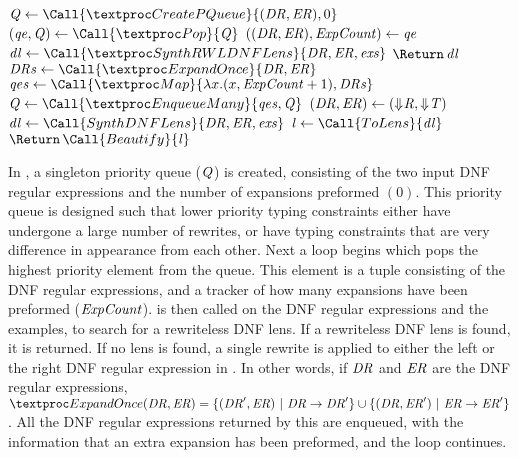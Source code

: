 \documentclass[numbers,10pt,preprint\ifanon ,nocopyrightspace\fi]{sigplanconf}
\begin{document}
\begin{algorithm}
  \caption{\SynthLens}
  \label{alg:synthlens}
  \begin{algorithmic}[1]
    \State $\Queue \gets \Call{\CreatePQueue}{(\DNFRegex,\DNFRegexAlt),0}$
    \While{$\True$}
    \State $(\QueueElement,\Queue) \gets \Call{\Pop}{\Queue}$
    \State $((\mathit{DR},\mathit{ER}),\mathit{ExpCount}) \gets \mathit{qe}$
    \State $\DNFLens \gets
    \Call{\SynthRWLDNFLens}{\DNFRegex,\DNFRegexAlt,\Examples}$
    \If{$\DNFLens \neq \Null$}
    \State $\ReturnVal{\DNFLens}$
    \Else
    \State $\DNFRegexs \gets \Call{\ExpandOnce}{\DNFRegex,\DNFRegexAlt}$
    \State $\QueueElements \gets \Call{\Map}{\lambda x.(x,\ExpCount+1),\DNFRegexs}$
    \State $\Queue \gets \Call{\EnqueueMany}{\QueueElements,\Queue}$
    \EndIf
    \EndWhile
    \EndFunction
    \Statex
    \State $(\mathit{DR},\mathit{ER}) \gets
    (\Downarrow\mkern-4mu \mathit{R},\Downarrow\mkern-4mu \mathit{T})$
    \State $\DNFLens \gets \Call{SynthDNFLens}{\DNFRegex,\DNFRegexAlt,\Examples}$
    \State $\Lens \gets \Call{ToLens}{\DNFLens}$
    \State $\ReturnVal{\Call{Beautify}{\Lens}}$
    \EndFunction
  \end{algorithmic}
\end{algorithm}

In \SynthDNFLens{}, a singleton priority queue ($\mathit{Q}$) is created, consisting of the
two input DNF regular expressions and the number of expansions preformed $(0)$.
This priority queue is designed
such that lower priority typing constraints either have undergone a large number
of rewrites, or have typing constraints that are very difference in appearance
from each other.
Next a loop begins which pops the highest priority element from the queue.
This element is a tuple consisting of the DNF regular expressions, and a tracker
of how many expansions have been preformed ($\mathit{ExpCount}$).
\SynthRWLDNFLens is then called on the DNF regular expressions and
the examples, to search for a rewriteless DNF lens.
If a rewriteless DNF lens is found, it is returned.
If no lens is found, a single rewrite is applied to either the left or the right
DNF regular expression in \ExpandOnce.  In other words, if $\mathit{DR}$ and
$\mathit{ER}$ are the DNF regular expressions,
$\PCF{ExpandOnce}(\DNFRegex,\DNFRegexAlt) =
\SetOf{(\DNFRegex',\DNFRegexAlt) \SuchThat \DNFRegex \Rewrite \DNFRegex'}
\Union
\SetOf{(\DNFRegex,\DNFRegexAlt') \SuchThat \DNFRegexAlt \Rewrite \DNFRegexAlt'}$.
All the DNF regular expressions returned by this are enqueued, with the
information that an extra expansion has been preformed, and the loop continues.
\end{document}
